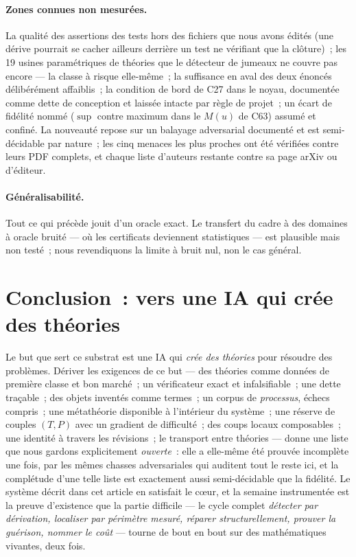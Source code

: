 \documentclass[11pt]{article}
\theoremstyle{remark}\newtheorem{example}{Exemple}
\begin{document}
\paragraph{Zones connues non mesurées.} La qualité des assertions des tests hors des
fichiers que nous avons édités (une dérive pourrait se cacher ailleurs derrière un test
ne vérifiant que la clôture)~; les 19 usines paramétriques de théories que le détecteur
de jumeaux ne couvre pas encore --- la classe à risque elle-même~; la suffisance en
aval des deux énoncés délibérément affaiblis~; la condition de bord de C27 dans le
noyau, documentée comme dette de conception et laissée intacte par règle de projet~;
un écart de fidélité nommé ($\sup$ contre maximum dans le $M(u)$ de C63) assumé et
confiné. La nouveauté repose sur un balayage adversarial documenté et est
semi-décidable par nature~; les cinq menaces les plus proches ont été vérifiées contre
leurs PDF complets, et chaque liste d'auteurs restante contre sa page arXiv ou
d'éditeur.

\paragraph{Généralisabilité.} Tout ce qui précède jouit d'un oracle exact. Le transfert
du cadre à des domaines à oracle bruité --- où les certificats deviennent statistiques
--- est plausible mais non testé~; nous revendiquons la limite à bruit nul, non le cas
général.

\section{Conclusion~: vers une IA qui crée des théories}
Le but que sert ce substrat est une IA qui \emph{crée des théories} pour résoudre des
problèmes. Dériver les exigences de ce but --- des théories comme données de première
classe et bon marché~; un vérificateur exact et infalsifiable~; une dette traçable~;
des objets inventés comme termes~; un corpus de \emph{processus}, échecs compris~; une
métathéorie disponible à l'intérieur du système~; une réserve de couples $(T,P)$ avec
un gradient de difficulté~; des coups locaux composables~; une identité à travers les
révisions~; le transport entre théories --- donne une liste que nous gardons
explicitement \emph{ouverte}~: elle a elle-même été prouvée incomplète une fois, par
les mêmes chasses adversariales qui auditent tout le reste ici, et la complétude d'une
telle liste est exactement aussi semi-décidable que la fidélité. Le système décrit dans
cet article en satisfait le c\oe ur, et la semaine instrumentée est la preuve
d'existence que la partie difficile --- le cycle complet \emph{détecter par dérivation,
localiser par périmètre mesuré, réparer structurellement, prouver la guérison, nommer
le coût} --- tourne de bout en bout sur des mathématiques vivantes, deux fois.
\end{document}
